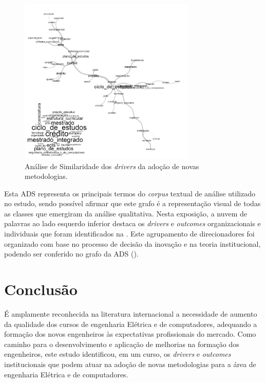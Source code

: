 \documentclass{textolivre-html}
\begin{document}
\begin{figure}[htbp]
 \centering
 \includegraphics[width=0.75\textwidth]{Fig05.png}
 \caption{Análise de Similaridade dos \textit{drivers} da adoção de novas metodologias.}
 \label{Fig05}
\end{figure}

Esta ADS representa os principais termos do \textit{corpus} textual de análise utilizado no estudo, sendo possível afirmar que este grafo é a representação visual de todas as classes que emergiram da análise qualitativa. Nesta exposição, a nuvem de palavras ao lado esquerdo inferior destaca os \textit{drivers} e \textit{outcomes} organizacionais e individuais que foram identificados na . Este agrupamento de direcionadores foi organizado com base no processo de decisão da inovação e na teoria institucional, podendo ser conferido no grafo da ADS ().

\section{Conclusão}\label{sec-conclusao}
É amplamente reconhecida na literatura internacional a necessidade de aumento da qualidade dos cursos de engenharia Elétrica e de computadores, adequando a formação dos novos engenheiros às expectativas profissionais do mercado. Como caminho para o desenvolvimento e aplicação de melhorias na formação dos engenheiros, este estudo identificou, em um curso, os \textit{drivers} e \textit{outcomes} institucionais que podem atuar na adoção de novas metodologias para a área de engenharia Elétrica e de computadores.
\end{document}
